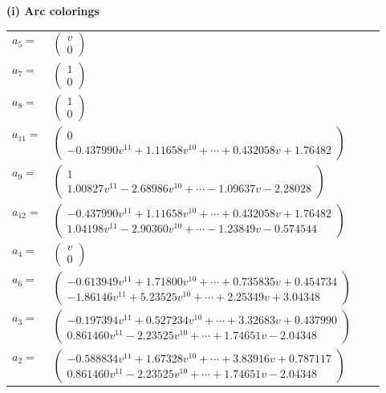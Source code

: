 \documentclass[1p]{elsarticle_modified}
\theoremstyle{definition}
\begin{document}
\flushleft \textbf{(i) Arc colorings}\\
\begin{tabular}{m{7pt} m{180pt} m{7pt} m{180pt} }
\flushright $a_{5}=$&$\begin{pmatrix}v\\0\end{pmatrix}$ \\
\flushright $a_{7}=$&$\begin{pmatrix}1\\0\end{pmatrix}$ \\
\flushright $a_{8}=$&$\begin{pmatrix}1\\0\end{pmatrix}$ \\
\flushright $a_{11}=$&$\begin{pmatrix}0\\-0.437990 v^{11}+1.11658 v^{10}+\cdots+0.432058 v+1.76482\end{pmatrix}$ \\
\flushright $a_{9}=$&$\begin{pmatrix}1\\1.00827 v^{11}-2.68986 v^{10}+\cdots-1.09637 v-2.28028\end{pmatrix}$ \\
\flushright $a_{12}=$&$\begin{pmatrix}-0.437990 v^{11}+1.11658 v^{10}+\cdots+0.432058 v+1.76482\\1.04198 v^{11}-2.90360 v^{10}+\cdots-1.23849 v-0.574544\end{pmatrix}$ \\
\flushright $a_{4}=$&$\begin{pmatrix}v\\0\end{pmatrix}$ \\
\flushright $a_{6}=$&$\begin{pmatrix}-0.613949 v^{11}+1.71800 v^{10}+\cdots+0.735835 v+0.454734\\-1.86146 v^{11}+5.23525 v^{10}+\cdots+2.25349 v+3.04348\end{pmatrix}$ \\
\flushright $a_{3}=$&$\begin{pmatrix}-0.197394 v^{11}+0.527234 v^{10}+\cdots+3.32683 v+0.437990\\0.861460 v^{11}-2.23525 v^{10}+\cdots+1.74651 v-2.04348\end{pmatrix}$ \\
\flushright $a_{2}=$&$\begin{pmatrix}-0.588834 v^{11}+1.67328 v^{10}+\cdots+3.83916 v+0.787117\\0.861460 v^{11}-2.23525 v^{10}+\cdots+1.74651 v-2.04348\end{pmatrix}$ \\

\end{tabular}
\end{document}
